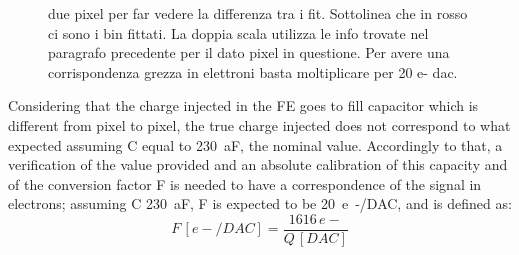 \begin{figure}[h!]
            \caption{due pixel per far vedere la differenza tra i fit. Sottolinea che in rosso ci sono i bin fittati. La doppia scala utilizza le info trovate nel paragrafo precedente per il dato pixel in questione. Per avere una corrispondenza grezza in elettroni basta moltiplicare per 20 e- dac. }
        \end{figure}  
        Considering that the charge injected in the FE goes to fill capacitor which is different from pixel to pixel, the true charge injected does not correspond to what expected assuming C equal to \SI{230}{aF}, the nominal value. 
        Accordingly to that, a verification of the value provided and an absolute calibration of this capacity and of the conversion factor F is needed to have a correspondence of the signal in electrons; assuming C \SI{230}{aF}, F is expected to be \SI{20}{e-/DAC}, and is defined as:
        \begin{equation}
            F\, [e-/DAC] = \frac{1616\,e-}{Q\,[DAC]}
        \end{equation}

